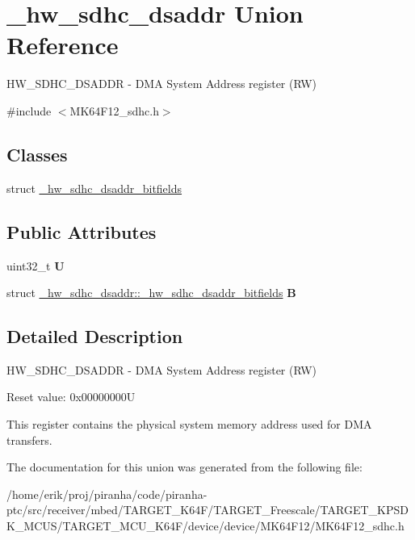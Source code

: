 \hypertarget{union__hw__sdhc__dsaddr}{}\section{\+\_\+hw\+\_\+sdhc\+\_\+dsaddr Union Reference}
\label{union__hw__sdhc__dsaddr}


H\+W\+\_\+\+S\+D\+H\+C\+\_\+\+D\+S\+A\+D\+DR -\/ D\+MA System Address register (RW)  




{\ttfamily \#include $<$M\+K64\+F12\+\_\+sdhc.\+h$>$}

\subsection*{Classes}
\begin{DoxyCompactItemize}
\item 
struct \hyperlink{struct__hw__sdhc__dsaddr_1_1__hw__sdhc__dsaddr__bitfields}{\+\_\+hw\+\_\+sdhc\+\_\+dsaddr\+\_\+bitfields}
\end{DoxyCompactItemize}
\subsection*{Public Attributes}
\begin{DoxyCompactItemize}
\item 
uint32\+\_\+t {\bfseries U}\hypertarget{union__hw__sdhc__dsaddr_ad3a7fa0ab06e273de47b1864eecc0297}{}\label{union__hw__sdhc__dsaddr_ad3a7fa0ab06e273de47b1864eecc0297}

\item 
struct \hyperlink{struct__hw__sdhc__dsaddr_1_1__hw__sdhc__dsaddr__bitfields}{\+\_\+hw\+\_\+sdhc\+\_\+dsaddr\+::\+\_\+hw\+\_\+sdhc\+\_\+dsaddr\+\_\+bitfields} {\bfseries B}\hypertarget{union__hw__sdhc__dsaddr_a3c277973109f2231a41736ac571d7d89}{}\label{union__hw__sdhc__dsaddr_a3c277973109f2231a41736ac571d7d89}

\end{DoxyCompactItemize}


\subsection{Detailed Description}
H\+W\+\_\+\+S\+D\+H\+C\+\_\+\+D\+S\+A\+D\+DR -\/ D\+MA System Address register (RW) 

Reset value\+: 0x00000000U

This register contains the physical system memory address used for D\+MA transfers. 

The documentation for this union was generated from the following file\+:\begin{DoxyCompactItemize}
\item 
/home/erik/proj/piranha/code/piranha-\/ptc/src/receiver/mbed/\+T\+A\+R\+G\+E\+T\+\_\+\+K64\+F/\+T\+A\+R\+G\+E\+T\+\_\+\+Freescale/\+T\+A\+R\+G\+E\+T\+\_\+\+K\+P\+S\+D\+K\+\_\+\+M\+C\+U\+S/\+T\+A\+R\+G\+E\+T\+\_\+\+M\+C\+U\+\_\+\+K64\+F/device/device/\+M\+K64\+F12/M\+K64\+F12\+\_\+sdhc.\+h\end{DoxyCompactItemize}
